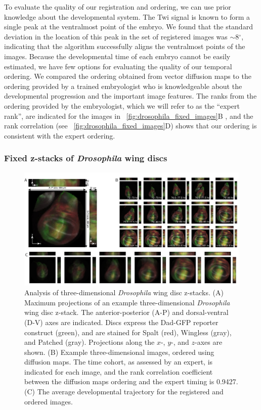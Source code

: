 To evaluate the quality of our registration and ordering, we can use prior knowledge about the developmental system.
%
The Twi signal is known to form a single peak at the ventralmost point of the embryo.
%
We found that the standard deviation in the location of this peak in the set of registered images was $\sim$8$^\circ$,
indicating that the algorithm successfully aligns the ventralmost points of the images.
%
Because the developmental time of each embryo cannot be easily estimated, we have few options for evaluating the quality of our temporal ordering.
%
We compared the ordering obtained from vector diffusion maps to the ordering provided by a trained embryologist who is knowledgeable about the developmental progression and the important image features.
%
The ranks from the ordering provided by the embryologist, which we will refer to as the ``expert rank'', are indicated for the images in \fig~\ref{fig:drosophila_fixed_images}B , and the rank correlation (see \fig~\ref{fig:drosophila_fixed_images}D) shows that our ordering is consistent with the expert ordering.


\subsubsection{Fixed z-stacks of {\em Drosophila} wing discs}

\begin{figure}[t]
\includegraphics[width=\textwidth]{fig6}
\caption[Analysis of three-dimensional {\em Drosophila} wing disc z-stacks]{Analysis of three-dimensional {\em Drosophila} wing disc z-stacks. (A) Maximum projections of an example three-dimensional {\em Drosophila} wing disc z-stack. The anterior-posterior (A-P) and dorsal-ventral (D-V) axes are indicated. Discs express the Dad-GFP reporter construct (green), and are stained for Spalt (red), Wingless (gray), and Patched (gray). Projections along the $x$-, $y$-, and $z$-axes are shown. (B) Example three-dimensional images, ordered using diffusion maps. The time cohort, as assessed by an expert, is indicated for each image, and the rank correlation coefficient between the diffusion maps ordering and the expert timing is 0.9427. (C) The average developmental trajectory for the registered and ordered images. }
\label{fig:wing_disc}
\end{figure}

